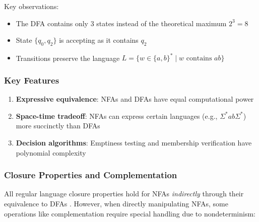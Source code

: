 \noindent{}Key observations:
\begin{itemize}
    \item The DFA contains only 3 states instead of the theoretical maximum \( 2^3 = 8 \) \cite{hopcroft2006introduction}
    \item State \(\{q_0, q_2\}\) is accepting as it contains \( q_2 \)
    \item Transitions preserve the language \( L = \{ w \in \{a, b\}^* \mid w \text{ contains } ab \} \)
\end{itemize}

\subsubsection{Key Features}
\begin{enumerate}
    \item \textbf{Expressive equivalence}: NFAs and DFAs have equal computational power \cite{hopcroft2006introduction}
    \item \textbf{Space-time tradeoff}: NFAs can express certain languages (e.g., \( \Sigma^*ab\Sigma^* \)) more succinctly than DFAs \cite{bianchi2014size}
    \item \textbf{Decision algorithms}: Emptiness testing and membership verification have polynomial complexity \cite{rabin1963probabilistic}
\end{enumerate}

\subsubsection{Closure Properties and Complementation}
All regular language closure properties hold for NFAs \textit{indirectly} through their equivalence to DFAs \cite{hopcroft2006introduction}.
However, when directly manipulating NFAs, some operations like complementation require special handling due to nondeterminism:

